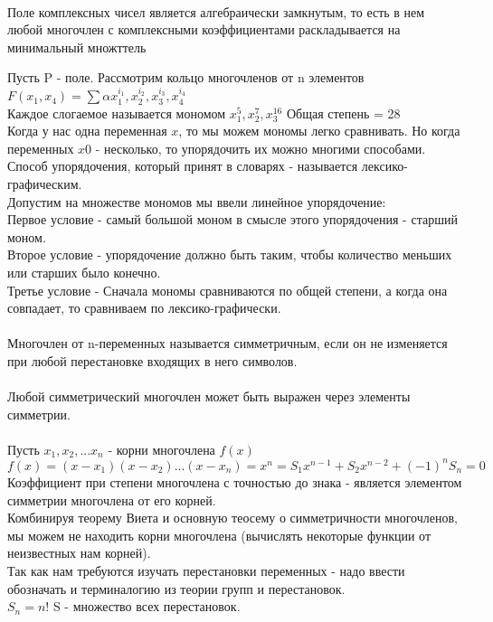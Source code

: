 \\
Поле комплексных чисел является алгебраически замкнутым, то есть в нем любой 
многочлен с комплексными коэффициентами раскладывается на минимальный 
множттель\\

\begin{center}
\end{center}

Пусть P - поле. Рассмотрим кольцо многочленов от n элементов\\
$F(x_1, x_4) = \sum \alpha x^{i_1}_1, x^{i_2}_2, x^{i_3}_3, x^{i_4}_4$\\
Каждое слогаемое называется мономом $x^{5}_1, x^{7}_2, x^{16}_3$ 
Общая степень = 28\\
Когда у нас одна переменная $x$, то мы можем мономы легко сравнивать. Но когда
переменных $x0$ - несколько, то упорядочить их можно многими способами.\\
Способ упорядочения, который принят в словарях - называется 
лексико-графическим.\\
Допустим на множестве мономов мы ввели линейное упорядочение:\\
Первое условие - самый большой моном в смысле этого упорядочения - старший
моном.\\
Второе условие - упорядочение должно быть таким, чтобы количество меньших или
старших было конечно.\\
Третье условие - Сначала мономы сравниваются по общей степени, а когда она
совпадает, то сравниваем по лексико-графически.\\

\\
Многочлен от n-переменных называется симметричным, если он не изменяется при 
любой перестановке входящих в него символов.\\

\\
Любой симметрический многочлен может быть выражен через элементы симметрии.\\

\\
Пусть $x_1, x_2, ... x_n$ - корни многочлена $f(x)$\\
$f(x) = (x - x_1)(x - x_2) ... (x - x_n) = x^n = S_1 x^{n - 1} + S_2 x^{n - 2} +
(-1)^n S_n = 0$\\
Коэффициент при степени многочлена с точностью до знака - является элементом 
симметрии многочлена от его корней.\\
Комбинируя теорему Виета и основную теосему о симметричности многочленов, мы
можем не находить корни многочлена (вычислять некоторые функции от неизвестных 
нам корней).\\
Так как нам требуются изучать перестановки переменных - надо ввести обозначать и
терминалогию из теории групп и перестановок.\\
$S_n = n!$ S - множество всех перестановок.\\

